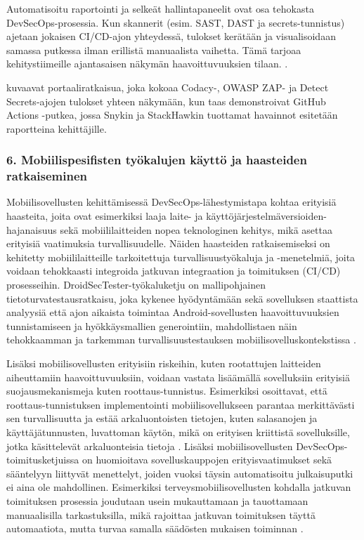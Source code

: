 \documentclass[bscthesis,finnish,oneside,biblatex]{uefcsthesis}
\begin{document}
    Automatisoitu raportointi ja selkeät hallintapaneelit ovat osa tehokasta DevSecOps-prosessia. Kun skannerit (esim. SAST, DAST ja secrets-tunnistus) ajetaan jokaisen CI/CD-ajon yhteydessä, tulokset kerätään ja visualisoidaan samassa putkessa ilman erillistä manuaalista vaihetta. Tämä tarjoaa kehitystiimeille ajantasaisen näkymän haavoittuvuuksien tilaan. \cite{marandi2023_ias,aljohani2023_automating}.

    \cite{aljohani2023_automating} kuvaavat portaaliratkaisua, joka kokoaa Codacy-, OWASP ZAP- ja Detect Secrets-ajojen tulokset yhteen näkymään, kun taas \cite{marandi2023_ias} demonstroivat GitHub Actions -putkea, jossa Snykin ja StackHawkin tuottamat havainnot esitetään raportteina kehittäjille.

    \subsubsection{6. Mobiilispesifisten työkalujen käyttö ja haasteiden ratkaiseminen}

    Mobiilisovellusten kehittämisessä DevSecOps-lähestymistapa kohtaa erityisiä haasteita, joita ovat esimerkiksi laaja laite- ja käyttöjärjestelmäversioiden-hajanaisuus sekä mobiililaitteiden nopea teknologinen kehitys, mikä asettaa erityisiä vaatimuksia turvallisuudelle. Näiden haasteiden ratkaisemiseksi on kehitetty mobiililaitteille tarkoitettuja turvallisuustyökaluja ja -menetelmiä, joita voidaan tehokkaasti integroida jatkuvan integraation ja toimituksen (CI/CD) prosesseihin. DroidSecTester-työkaluketju on mallipohjainen tietoturvatestausratkaisu, joka kykenee hyödyntämään sekä sovelluksen staattista analyysiä että ajon aikaista toimintaa Android-sovellusten haavoittuvuuksien tunnistamiseen ja hyökkäysmallien generointiin, mahdollistaen näin tehokkaamman ja tarkemman turvallisuustestauksen mobiilisovelluskontekstissa \cite{baheux2023_droidsectester}.

    Lisäksi mobiilisovellusten erityisiin riskeihin, kuten rootattujen laitteiden aiheuttamiin haavoittuvuuksiin, voidaan vastata lisäämällä sovelluksiin erityisiä suojausmekanismeja kuten roottaus-tunnistus. Esimerkiksi \cite{mukti2023_passwordmanager} osoittavat, että roottaus-tunnistuksen implementointi mobiilisovellukseen parantaa merkittävästi sen turvallisuutta ja estää arkaluontoisten tietojen, kuten salasanojen ja käyttäjätunnusten, luvattoman käytön, mikä on erityisen kriittistä sovelluksille, jotka käsittelevät arkaluonteisia tietoja \cite{mukti2023_passwordmanager}. Lisäksi mobiilisovellusten DevSecOps-toimitusketjuissa on huomioitava sovelluskauppojen erityisvaatimukset sekä sääntelyyn liittyvät menettelyt, joiden vuoksi täysin automatisoitu julkaisuputki ei aina ole mahdollinen. Esimerkiksi terveysmobiilisovellusten kohdalla jatkuvan toimituksen prosessia joudutaan usein mukauttamaan ja tauottamaan manuaalisilla tarkastuksilla, mikä rajoittaa jatkuvan toimituksen täyttä automaatiota, mutta turvaa samalla säädösten mukaisen toiminnan \cite{byman2024continuous}.
\end{document}
